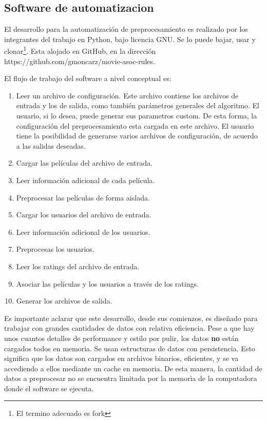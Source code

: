 \documentclass[journal]{IEEEtran}
\begin{document}
\subsection{Software de automatizacion}
El desarrollo para la automatización de preprocesamiento es realizado por 
los integrantes del trabajo en Python, bajo licencia GNU. Se lo puede bajar,
usar y clonar\footnote{El termino adecuado es fork}. Esta alojado en GitHub, en la 
dirección https://github.com/gmoncarz/movie-asoc-rules. 

El flujo de trabajo del software a nivel conceptual es:
\begin{enumerate}
\item Leer un archivo de configuración. Este archivo 
contiene los archivos de entrada y los de salida,
como también parámetros generales del algoritmo.
El usuario, si lo desea, puede generar sus parametros custom. De
esta forma, la configuración del preprocesamiento esta cargada en este
archivo. El usuario tiene la posibilidad de generarse varios archivos
de configuración, de acuerdo a las salidas deseadas.
\item Cargar las películas del archivo de entrada.
\item Leer información adicional de cada película.
\item Preprocesar las películas de forma aislada.
\item Cargar los usuarios del archivo de entrada.
\item Leer información adicional de los usuarios.
\item Preprocesas los usuarios.
\item Leer los ratings del archivo de entrada.
\item Asociar las películas y los usuarios a través de los ratings.
\item Generar los archivos de salida.
\end{enumerate}

Es importante aclarar que este desarrollo, desde sus comienzos,
es diseñado para trabajar con grandes cantidades de datos con relativa
eficiencia. Pese a que hay unos cuantos detalles de performance 
y estilo por pulir,
los datos \textbf{no} están cargados todos en memoria. Se usan estructuras
de datos con persistencia. Esto significa que los datos son cargados en
archivos binarios, eficientes, y se va accediendo a ellos mediante
un cache en memoria. De esta manera, la cantidad de datos a preprocesar
no se encuentra limitada por la memoria de la computadora donde
el software se ejecuta.
\end{document}
